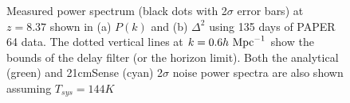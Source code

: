 \documentclass[onecolumn]{emulateapj} \shorttitle{}
\newcommand{\hMpci}{h\ {\rm Mpc}^{-1}}
\begin{document}
\begin{figure}%
    \centering
    \qquad
    \caption{Measured power spectrum (black dots with 2$\sigma$ error bars) at $z=8.37$ shown in (a) $P(k)$ and (b) $\Delta^{2}$
             using 135 days of PAPER 64 data. The dotted vertical lines at $k=0.6\hMpci$ show the bounds of the delay filter (or the horizon limit).
             Both the analytical (green) and 21cmSense (cyan) 2$\sigma$ noise power spectra are also shown assuming $T_{sys}=144K$}%
    \label{fig:updated_pspec}%
\end{figure}

\clearpage
\nocite{*}


\end{document}
